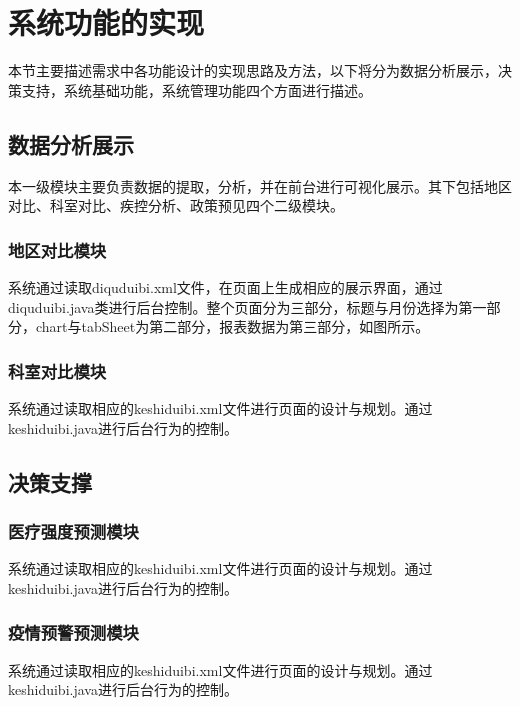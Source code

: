 \documentclass{husethesis}
\begin{document}

\section{系统功能的实现}


本节主要描述需求中各功能设计的实现思路及方法，以下将分为数据分析展示，决策支持，系统基础功能，系统管理功能四个方面进行描述。

\subsection{数据分析展示}
本一级模块主要负责数据的提取，分析，并在前台进行可视化展示。其下包括地区对比、科室对比、疾控分析、政策预见四个二级模块。

\subsubsection{地区对比模块}
系统通过读取diquduibi.xml文件，在页面上生成相应的展示界面，通过diquduibi.java类进行后台控制。整个页面分为三部分，标题与月份选择为第一部分，chart与tabSheet为第二部分，报表数据为第三部分，如图所示。


\subsubsection{科室对比模块}
系统通过读取相应的keshiduibi.xml文件进行页面的设计与规划。通过keshiduibi.java进行后台行为的控制。

\subsection{决策支撑}

\subsubsection{医疗强度预测模块}
系统通过读取相应的keshiduibi.xml文件进行页面的设计与规划。通过keshiduibi.java进行后台行为的控制。

\subsubsection{疫情预警预测模块}
系统通过读取相应的keshiduibi.xml文件进行页面的设计与规划。通过keshiduibi.java进行后台行为的控制。
\end{document}
